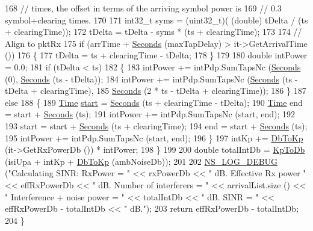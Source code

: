 \begin{DoxyCode}
168       \textcolor{comment}{// times, the offset in terms of the arriving symbol power is}
169       \textcolor{comment}{// 0.3 symbol+clearing times.}
170 
171       int32\_t syms = (uint32\_t)( (\textcolor{keywordtype}{double}) tDelta / (ts + clearingTime));
172       tDelta = tDelta - syms * (ts + clearingTime);
173 
174       \textcolor{comment}{// Align to pktRx}
175       \textcolor{keywordflow}{if} (arrTime + \hyperlink{group__timecivil_ga33c34b816f8ff6628e33d5c8e9713b9e}{Seconds} (maxTapDelay)  > it->GetArrivalTime ())
176         \{
177           tDelta = ts + clearingTime - tDelta;
178         \}
179 
180       \textcolor{keywordtype}{double} intPower = 0.0;
181       \textcolor{keywordflow}{if} (tDelta < ts)
182         \{
183           intPower += intPdp.SumTapsNc (\hyperlink{group__timecivil_ga33c34b816f8ff6628e33d5c8e9713b9e}{Seconds} (0), \hyperlink{group__timecivil_ga33c34b816f8ff6628e33d5c8e9713b9e}{Seconds} (ts - tDelta));
184           intPower += intPdp.SumTapsNc (\hyperlink{group__timecivil_ga33c34b816f8ff6628e33d5c8e9713b9e}{Seconds} (ts - tDelta + clearingTime),
185                                         \hyperlink{group__timecivil_ga33c34b816f8ff6628e33d5c8e9713b9e}{Seconds} (2 * ts - tDelta + clearingTime));
186         \}
187       \textcolor{keywordflow}{else}
188         \{
189           \hyperlink{namespacens3_1_1TracedValueCallback_a7ffd3e7c142ffe7c8a1d2db9b8de38ec}{Time} \hyperlink{namespacevisualizer_1_1core_a2a35e5d8a34af358b508dac8635754e0}{start} = \hyperlink{group__timecivil_ga33c34b816f8ff6628e33d5c8e9713b9e}{Seconds} (ts + clearingTime - tDelta);
190           \hyperlink{namespacens3_1_1TracedValueCallback_a7ffd3e7c142ffe7c8a1d2db9b8de38ec}{Time} end = start + \hyperlink{group__timecivil_ga33c34b816f8ff6628e33d5c8e9713b9e}{Seconds} (ts);
191           intPower += intPdp.SumTapsNc (start, end);
192 
193           start = start + \hyperlink{group__timecivil_ga33c34b816f8ff6628e33d5c8e9713b9e}{Seconds} (ts + clearingTime);
194           end = start + \hyperlink{group__timecivil_ga33c34b816f8ff6628e33d5c8e9713b9e}{Seconds} (ts);
195           intPower += intPdp.SumTapsNc (start, end);
196         \}
197       intKp += \hyperlink{classns3_1_1UanPhyCalcSinr_a7af4e8735a93dabeef93d929fe166d27}{DbToKp} (it->GetRxPowerDb ()) * intPower;
198     \}
199 
200   \textcolor{keywordtype}{double} totalIntDb = \hyperlink{classns3_1_1UanPhyCalcSinr_a5f57a07d4f7e8e457a4c6fb946b9ec96}{KpToDb} (isiUpa + intKp + \hyperlink{classns3_1_1UanPhyCalcSinr_a7af4e8735a93dabeef93d929fe166d27}{DbToKp} (ambNoiseDb));
201 
202   \hyperlink{group__logging_ga413f1886406d49f59a6a0a89b77b4d0a}{NS\_LOG\_DEBUG} (\textcolor{stringliteral}{"Calculating SINR:  RxPower = "} << rxPowerDb << \textcolor{stringliteral}{" dB.  Effective Rx power "} << 
      effRxPowerDb << \textcolor{stringliteral}{" dB.  Number of interferers = "} << arrivalList.size () << \textcolor{stringliteral}{"  Interference + noise power = "}
       << totalIntDb << \textcolor{stringliteral}{" dB.  SINR = "} << effRxPowerDb - totalIntDb << \textcolor{stringliteral}{" dB."});
203   \textcolor{keywordflow}{return} effRxPowerDb - totalIntDb;
204 \}
\end{DoxyCode}


